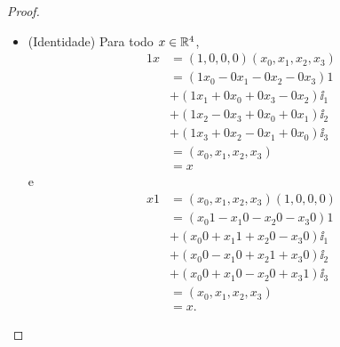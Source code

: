 \begin{proof}
\begin{itemize}
	\item (Identidade) Para todo $x \in \mathbb{R}^4$,
		\begin{align*}
		1x &= (1,0,0,0)(x_0,x_1,x_2,x_3) \\
			&= (1 x_0 - 0 x_1 - 0 x_2 - 0 x_3)1 \\
			&+ (1 x_1 + 0 x_0 + 0 x_3 - 0 x_2)\ii_1 \\
			&+ (1 x_2 - 0 x_3 + 0 x_0 + 0 x_1)\ii_2 \\
			&+ (1 x_3 + 0 x_2 - 0 x_1 + 0 x_0)\ii_3 \\
			&= (x_0,x_1,x_2,x_3) \\
			&= x
		\end{align*}
	e
		\begin{align*}
		x1 &= (x_0,x_1,x_2,x_3)(1,0,0,0) \\
			&= (x_0 1 - x_1 0 - x_2 0 - x_3 0)1 \\
			&+ (x_0 0 + x_1 1 + x_2 0 - x_3 0)\ii_1 \\
			&+ (x_0 0 - x_1 0 + x_2 1 + x_3 0)\ii_2 \\
			&+ (x_0 0 + x_1 0 - x_2 0 + x_3 1)\ii_3 \\
			&= (x_0,x_1,x_2,x_3) \\
			&= x.
		\end{align*}
	

\end{itemize}
\end{proof}
